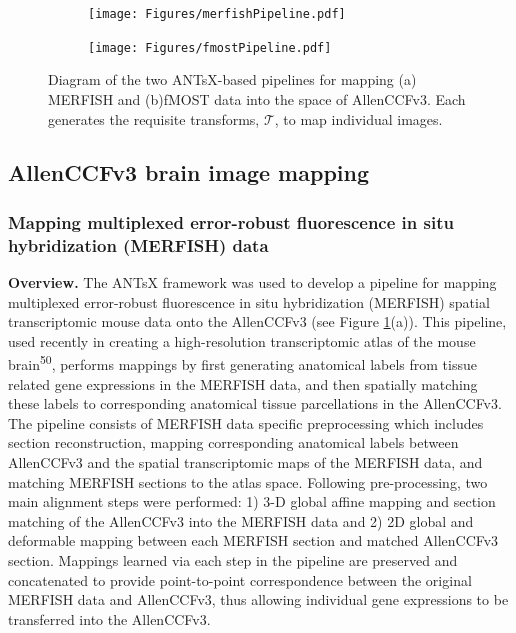\documentclass[
  12pt,
]{article}
\begin{document}
\begin{figure}
\centering
\begin{subfigure}[t]{0.49\textwidth}
\centering
\texttt{[image: Figures/merfishPipeline.pdf]}
\caption{}
\end{subfigure} 
\begin{subfigure}[t]{0.49\textwidth}
\centering
\texttt{[image: Figures/fmostPipeline.pdf]}
\caption{}
\end{subfigure}
\caption{Diagram of the two ANTsX-based pipelines for mapping (a) MERFISH
          and (b)fMOST data into the space of AllenCCFv3.  Each generates
         the requisite transforms, $\mathcal{T}$, to map individual images.}
\label{fig:allenpipelines}
\end{figure}

\subsection{AllenCCFv3 brain image
mapping}\label{allenccfv3-brain-image-mapping}

\subsubsection{Mapping multiplexed error-robust fluorescence in situ
hybridization (MERFISH)
data}\label{mapping-multiplexed-error-robust-fluorescence-in-situ-hybridization-merfish-data}

\textbf{Overview.} The ANTsX framework was used to develop a pipeline
for mapping multiplexed error-robust fluorescence in situ hybridization
(MERFISH) spatial transcriptomic mouse data onto the AllenCCFv3 (see
Figure \ref{fig:allenpipelines}(a)). This pipeline, used recently in
creating a high-resolution transcriptomic atlas of the mouse
brain\textsuperscript{50}, performs mappings by first generating
anatomical labels from tissue related gene expressions in the MERFISH
data, and then spatially matching these labels to corresponding
anatomical tissue parcellations in the AllenCCFv3. The pipeline consists
of MERFISH data specific preprocessing which includes section
reconstruction, mapping corresponding anatomical labels between
AllenCCFv3 and the spatial transcriptomic maps of the MERFISH data, and
matching MERFISH sections to the atlas space. Following pre-processing,
two main alignment steps were performed: 1) 3-D global affine mapping
and section matching of the AllenCCFv3 into the MERFISH data and 2) 2D
global and deformable mapping between each MERFISH section and matched
AllenCCFv3 section. Mappings learned via each step in the pipeline are
preserved and concatenated to provide point-to-point correspondence
between the original MERFISH data and AllenCCFv3, thus allowing
individual gene expressions to be transferred into the AllenCCFv3.
\end{document}
